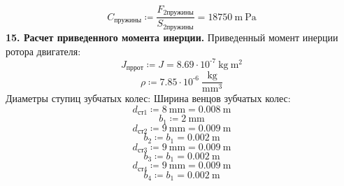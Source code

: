 \documentclass{article}
\newcommand{\defeq}{\coloneq} %
\begin{document}
\begin{equation*}
C_{пружины} \defeq \frac{\textit{F}_{\textit{2пружины}}}{\textit{S}_{\textit{2пружины}}} = {18750 \: \mathrm{m} \: \mathrm{Pa}}
\end{equation*}
\colorbox[HTML]{000000}{\textbf{15. Расчет приведенного момента инерции.}}\newline
\colorbox[HTML]{000000}{Приведенный момент инерции ротора двигателя:}\newline
\begin{equation*}
J_{пррот} \defeq J = {8.69 \cdot 10^{ \operatorname{-} 7} \: \mathrm{kg} \: \mathrm{m}^{2}}
\end{equation*}
\begin{equation*}
{\rho} \defeq 7.85 \cdot 10^{ \operatorname{-} 6} \: \frac{\mathrm{kg}}{\mathrm{mm}^{3}}
\end{equation*}
\colorbox[HTML]{000000}{Диаметры ступиц зубчатых колес:}\newline
\colorbox[HTML]{000000}{Ширина венцов зубчатых колес:}\newline
\begin{equation*}
\textit{d}_{\textit{ст1}} \defeq 8 \: \mathrm{mm} = {0.008 \: \mathrm{m}}
\end{equation*}
\begin{equation*}
\textit{b}_{\textit{1}} \defeq 2 \: \mathrm{mm}
\end{equation*}
\begin{equation*}
\textit{d}_{\textit{ст2}} \defeq 9 \: \mathrm{mm} = {0.009 \: \mathrm{m}}
\end{equation*}
\begin{equation*}
\textit{b}_{\textit{2}} \defeq \textit{b}_{\textit{1}} = {0.002 \: \mathrm{m}}
\end{equation*}
\begin{equation*}
\textit{d}_{\textit{ст3}} \defeq 9 \: \mathrm{mm} = {0.009 \: \mathrm{m}}
\end{equation*}
\begin{equation*}
\textit{b}_{\textit{3}} \defeq \textit{b}_{\textit{1}} = {0.002 \: \mathrm{m}}
\end{equation*}
\begin{equation*}
\textit{d}_{\textit{ст4}} \defeq 9 \: \mathrm{mm} = {0.009 \: \mathrm{m}}
\end{equation*}
\begin{equation*}
\textit{b}_{\textit{4}} \defeq \textit{b}_{\textit{1}} = {0.002 \: \mathrm{m}}
\end{equation*}
\end{document}
